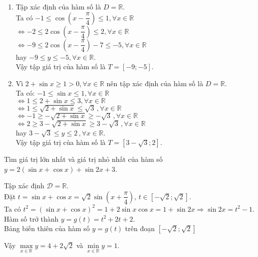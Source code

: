 \begin{ex}
{\begin{enumerate}
		Vậy tập giá trị của hàm số là $T=\left[-4;\sqrt{3}-5\right]$.
		\item Tập xác định của hàm số là $D=\mathbb{R}$.\\
		Ta có $-1\le \cos \left(x-\dfrac{\pi }{4}\right)\le 1,\forall x\in \mathbb{R}$\\
		$\Leftrightarrow -2\le 2\cos \left(x-\dfrac{\pi }{4}\right)\le 2,\forall x\in \mathbb{R}$\\
		$\Leftrightarrow -9\le 2\cos \left(x-\dfrac{\pi }{4}\right)-7\le -5,\forall x\in \mathbb{R}$\\
		hay $-9\le y\le -5,\forall x\in \mathbb{R}$.\\
		Vậy tập giá trị của hàm số là $T=\left[-9;-5\right]$.
		\item Vì $2+\sin x\ge 1>0,\forall x\in \mathbb{R}$ nên tập xác định của hàm số là $D=\mathbb{R}$.\\
		Ta có: $-1\le \sin x\le 1,\forall x\in \mathbb{R}$\\
		$\Leftrightarrow 1\le 2+\sin x\le 3,\forall x\in \mathbb{R}$\\
		$\Leftrightarrow 1\le \sqrt{2+\sin x}\le \sqrt{3}\,,\forall x\in \mathbb{R}$\\
		$\Leftrightarrow -1\ge -\sqrt{2+\sin x}\ge -\sqrt{3}\,,\forall x\in \mathbb{R}$\\
		$\Leftrightarrow 2\ge 3-\sqrt{2+\sin x}\ge 3-\sqrt{3}\,,\forall x\in \mathbb{R}$\\
		hay $3-\sqrt{3}\le y\le 2\,,\forall x\in \mathbb{R}$.\\
		Vậy tập giá trị của hàm số là $T=\left[3-\sqrt{3};2\right]$.
		\end{enumerate}
	}
\end{ex}

\begin{ex}%
	Tìm giá trị lớn nhất và giá trị nhỏ nhất của hàm số  $y=2(\sin x+\cos x)+\sin 2 x+3$.
	\loigiai
	{Tập xác định $\mathscr{D}=\mathbb{R}$.\\
		Đặt $t=\sin x+ \cos x=\sqrt{2}\sin \left(x+\dfrac{\pi}{4}\right)$, $t\in \left[-\sqrt{2};\sqrt{2}\right]$.\\
		Ta có $t^2=\left(\sin x+ \cos x\right)^2=1+2\sin x\cos x=1+\sin 2x\Rightarrow \sin 2x =t^2-1$.\\
		Hàm số trở thành $y=g(t)=t^2+2t+2$. \\
		Bảng biến thiên của hàm số $y=g(t)$ trên đoạn $ \left[-\sqrt{2};\sqrt{2}\right]$
		\begin{center}
		\end{center}
		Vậy $\max\limits_{x \in \mathbb{R}} y=4+2\sqrt{2}$ và $\min\limits_{x \in \mathbb{R}} y=1$.
	}
\end{ex}

